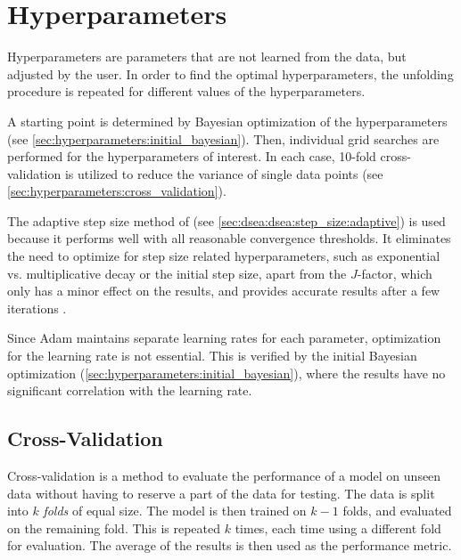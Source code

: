 \section{Hyperparameters}

Hyperparameters are parameters that are not learned from the data,
but adjusted by the user.
%
In order to find the optimal hyperparameters,
the unfolding procedure is repeated for different values of the hyperparameters.


A starting point is determined by Bayesian optimization of the hyperparameters
  (see \autoref{sec:hyperparameters:initial_bayesian}).
Then, individual grid searches are performed for the hyperparameters of interest.
%
In each case, 10-fold cross-validation is utilized to reduce the variance of single data points
  (see \autoref{sec:hyperparameters:cross_validation}).

The adaptive step size method of \dseaplus{}
  (see \autoref{sec:dsea:dsea:step_size:adaptive})
is used
because it performs well with all reasonable convergence thresholds.
It eliminates the need to optimize for step size related hyperparameters,
  such as
    exponential vs. multiplicative decay
    or the initial step size,
  apart from the $J$-factor,
    which only has a minor effect on the results,
and provides accurate results after a few iterations \cite{dsea_mirko}.

Since \ac{Adam} maintains separate learning rates for each parameter,
optimization for the learning rate is not essential.
This is verified by the initial Bayesian optimization (\autoref{sec:hyperparameters:initial_bayesian}),
  where the results have no significant correlation with the learning rate.


\subsection{Cross-Validation} \label{sec:hyperparameters:cross_validation}
Cross-validation \cite{cross_validation} is a method to evaluate the performance of a model on unseen data
without having to reserve a part of the data for testing.
%
The data is split into $k$ \emph{folds} of equal size. %
The model is then trained on $k-1$ folds,
and evaluated on the remaining fold.
This is repeated $k$ times,
each time using a different fold for evaluation.
The average of the results is then used as the performance metric.

